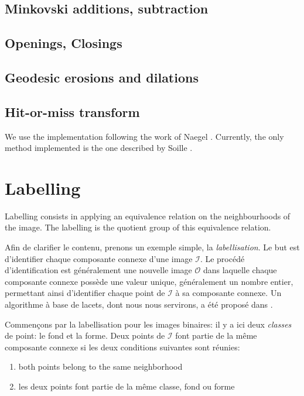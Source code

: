\section{Minkovski additions, subtraction }

\section{Openings, Closings}

\section{Geodesic erosions and dilations}

\section{Hit-or-miss transform}
We use the implementation following the work of Naegel \cite{naegel_htm:2007}. Currently, the only method implemented is the one described by Soille \cite{soille:1999}. 



\chapter{Labelling}
Labelling consists in applying an equivalence relation on the neighbourhoods of the image. The labelling is the quotient group of this equivalence relation. 



Afin de clarifier le contenu, prenons un exemple simple, la \textit{labellisation}. Le but est d'identifier chaque composante connexe d'une image $\mathcal I$. Le procédé d'identification est généralement une nouvelle image $\mathcal O$ dans laquelle chaque composante connexe possède une valeur unique, généralement un nombre entier, permettant ainsi d'identifier chaque point de $\mathcal I$ à sa composante connexe. Un algorithme à base de lacets, dont nous nous servirons, a été proposé dans \cite{schmitt:89}.

Commençons par la labellisation pour les images binaires: il y a ici deux \textit{classes} de point: le fond et la forme. Deux points de $\mathcal I$ font partie de la même composante connexe si les deux conditions suivantes sont réunies:
\begin{enumerate}
	\item both points belong to the same neighborhood
	\item les deux points font partie de la même classe, fond ou forme
\end{enumerate}


